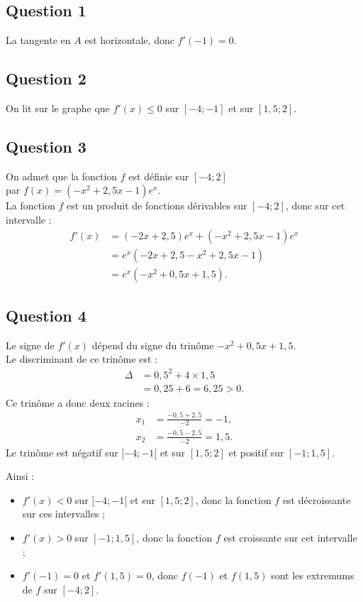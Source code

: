 \subsection*{Question 1}

La tangente en $A$ est horizontale, donc $f'(-1) = 0$.

\subsection*{Question 2}

On lit sur le graphe que $f'(x) \leq 0$ sur $[-4 ; -1]$ et sur $[1,5 ; 2]$.

\subsection*{Question 3}

On admet que la fonction $f$ est définie sur $[-4 ; 2]$ \\
par $f(x) = (-x^2 + 2,5x - 1)e^x$.\\
La fonction $f$ est un produit de fonctions dérivables sur $[-4 ; 2]$, donc sur cet intervalle :
\begin{align*}
	f'(x) &= (-2x + 2,5)e^x + (-x^2 + 2,5x - 1)e^x \\
	&= e^x \left( -2x + 2,5 - x^2 + 2,5x - 1 \right) \\
	&= e^x (-x^2 + 0,5x + 1,5).
\end{align*}

\subsection*{Question 4}

Le signe de $f'(x)$ dépend du signe du trinôme $-x^2 + 0,5x + 1,5$.\\
Le discriminant de ce trinôme est :
\begin{align*}
	\Delta &= 0,5^2 + 4 \times 1,5 \\
	&= 0,25 + 6 = 6,25 > 0.
\end{align*}
Ce trinôme a donc deux racines :
\begin{align*}
	x_1 &= \frac{-0,5 + 2,5}{-2} = -1, \\
	x_2 &= \frac{-0,5 - 2,5}{-2} = 1,5.
\end{align*}
Le trinôme est négatif sur $[-4 ; -1[$ et sur $[1,5 ; 2]$ et positif sur $[-1 ; 1,5]$.

Ainsi :
\begin{itemize}
	\item $f'(x) < 0$ sur $[-4 ; -1[$ et sur $[1,5 ; 2]$, donc la fonction $f$ est décroissante sur ces intervalles ;
	\item $f'(x) > 0$ sur $[-1 ; 1,5]$, donc la fonction $f$ est croissante sur cet intervalle ;
	\item $f'(-1) = 0$ et $f'(1,5) = 0$, donc $f(-1)$ et $f(1,5)$ sont les extremums de $f$ sur $[-4 ; 2]$.
\end{itemize}

